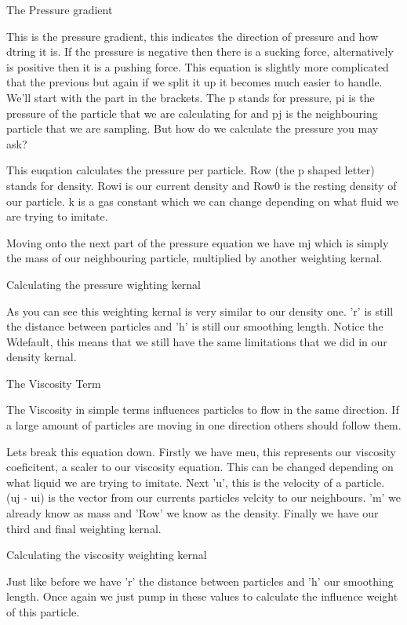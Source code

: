 The Pressure gradient\par
  This is the pressure gradient, this indicates the direction of pressure and how dtring it is. If the pressure is negative then there is a sucking force, alternatively is positive then it is a pushing force. This equation is slightly more complicated that the previous but again if we split it up it becomes much easier to handle. We'll start with the part in the brackets. The p stands for pressure, pi is the pressure of the particle that we are calculating for and pj is the neighbouring particle that we are sampling. But how do we calculate the pressure you may ask?\par
  This euqation calculates the pressure per particle. Row (the p shaped letter) stands for density. Rowi is our current density and Row0 is the resting density of our particle. k is a gas constant which we can change depending on what fluid we are trying to imitate.\par
 Moving onto the next part of the pressure equation we have mj which is simply the mass of our neighbouring particle, multiplied by another weighting kernal. \par
 Calculating the pressure wighting kernal\par
  As you can see this weighting kernal is very similar to our density one. 'r' is still the distance between particles and 'h' is still our smoothing length. Notice the Wdefault, this means that we still have the same limitations that we did in our density kernal.\par
 The Viscosity Term\par
  The Viscosity in simple terms influences particles to flow in the same direction. If a large amount of particles are moving in one direction others should follow them.\par
 Lets break this equation down. Firstly we have meu, this represents our viscosity coeficitent, a scaler to our viscosity equation. This can be changed depending on what liquid we are trying to imitate. Next 'u', this is the velocity of a particle. (uj -\/ ui) is the vector from our currents particles velcity to our neighbours. 'm' we already know as mass and 'Row' we know as the density. Finally we have our third and final weighting kernal. \par
 Calculating the viscosity weighting kernal\par
  Just like before we have 'r' the distance between particles and 'h' our smoothing length. Once again we just pump in these values to calculate the influence weight of this particle.\par
